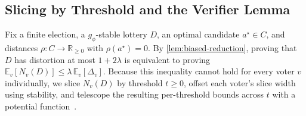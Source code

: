 \documentclass[11pt]{article}
\numberwithin{equation}{section}
\theoremstyle{plain}
\theoremstyle{definition}
\newcommand{\E}{\mathbb{E}}
\newcommand{\R}{\mathbb{R}}
\newcommand{\1}{\mathbf{1}}
\begin{document}
\subsection{Slicing by Threshold and the Verifier Lemma}
\label{sec:slicing-verifier}

Fix a finite election, a $g_\phi$-stable lottery $D$, an optimal candidate $a^\star \in C$, and distances $\rho \colon C \to \R_{\ge 0}$ with $\rho(a^\star) = 0$. By \cref{lem:biased-reduction}, proving that $D$ has distortion at most $1 + 2\lambda$ is equivalent to proving $\E_v[N_v(D)] \le \lambda\,\E_v[\Delta_v]$. Because this inequality cannot hold for every voter $v$ individually, we slice $N_v(D)$ by threshold $t \ge 0$, offset each voter's slice width using stability, and telescope the resulting per-threshold bounds across $t$ with a potential function~\cite{CaiEtAl26b}.
\end{document}

